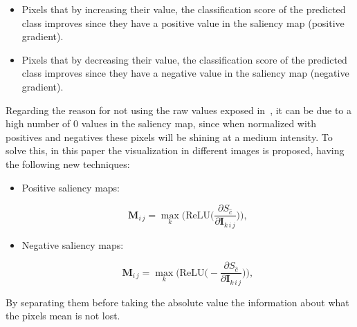 \documentclass[preprint,12pt]{elsarticle}
\begin{document}
\begin{itemize}
    \item Pixels that by increasing their value, the classification score of the predicted class improves since they have a positive value in the saliency map (positive gradient).
    \item Pixels that by decreasing their value, the classification score of the predicted class improves since they have a negative value in the saliency map (negative gradient).
\end{itemize}

Regarding the reason for not using the raw values exposed in~\cite{smilkovSmoothGradRemovingNoise}, it can be due to a high number of 0 values in the saliency map, since when normalized with positives and negatives these pixels will be shining at a medium intensity. To solve this, in this paper the visualization in different images is proposed, having the following new techniques:

\begin{itemize}
    \item Positive saliency maps:
    
    \begin{equation}
        \boldsymbol{M}_{i\, j} = \max_{k} \bigg ( \text{ReLU} \bigg (\frac{\partial S_{\hat{c}}}{\partial \boldsymbol{I}_{k\, i\, j}} \bigg ) \bigg ),
        \label{eq: positive saliency map}
    \end{equation}

    \item Negative saliency maps:
    
    \begin{equation}
      \boldsymbol{M}_{i\, j} = \max_{k} \bigg ( \text{ReLU} \bigg ( - \frac{\partial S_{\hat{c}}}{\partial \boldsymbol{I}_{k\, i\, j}} \bigg ) \bigg ),
      \label{eq: negative saliency map}
  \end{equation}

\end{itemize}

By separating them before taking the absolute value the information about what the pixels mean is not lost. 
\end{document}
